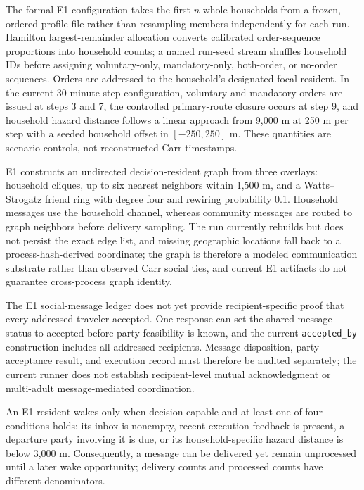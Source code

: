\documentclass[journal]{IEEEtran}
\begin{document}
The formal E1 configuration takes the first $n$ whole households from a frozen,
ordered profile file rather than resampling members independently for each run.
Hamilton largest-remainder allocation converts calibrated order-sequence
proportions into household counts; a named run-seed stream shuffles household
IDs before assigning voluntary-only, mandatory-only, both-order, or no-order
sequences. Orders are addressed to the household's designated focal resident.
In the current 30-minute-step configuration, voluntary and mandatory orders are
issued at steps 3 and 7, the controlled primary-route closure occurs at step 9,
and household hazard distance follows a linear approach from 9,000 m at 250 m
per step with a seeded household offset in $[-250,250]$ m. These quantities are
scenario controls, not reconstructed Carr timestamps.

E1 constructs an undirected decision-resident graph from three overlays:
household cliques, up to six nearest neighbors within 1,500 m, and a
Watts--Strogatz friend ring with degree four and rewiring probability 0.1.
Household messages use the household channel, whereas community messages are
routed to graph neighbors before delivery sampling. The run currently rebuilds
but does not persist the exact edge list, and missing geographic locations fall
back to a process-hash-derived coordinate; the graph is therefore a modeled
communication substrate rather than observed Carr social ties, and current E1
artifacts do not guarantee cross-process graph identity.

The E1 social-message ledger does not yet provide recipient-specific proof that
every addressed traveler accepted. One response can set the shared message
status to accepted before party feasibility is known, and the current
\texttt{accepted\_by} construction includes all addressed recipients. Message
disposition, party-acceptance result, and execution record must therefore be
audited separately; the current runner does not establish recipient-level
mutual acknowledgment or multi-adult message-mediated coordination.

An E1 resident wakes only when decision-capable and at least one of four
conditions holds: its inbox is nonempty, recent execution feedback is present,
a departure party involving it is due, or its household-specific hazard
distance is below 3,000 m. Consequently, a message can be delivered yet remain
unprocessed until a later wake opportunity; delivery counts and processed
counts have different denominators.
\end{document}
